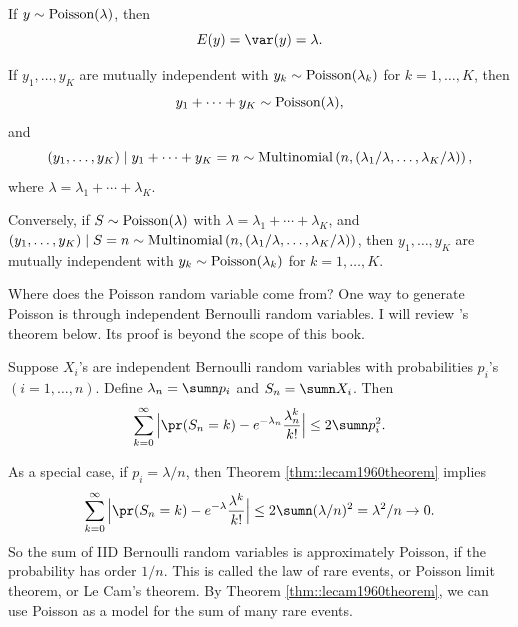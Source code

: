 \begin{proposition}\label{prop::poisson-1}
If $y\sim \textup{Poisson} (\lambda)$, then 
$$
E(y)=\var(y)=\lambda.
$$
\end{proposition}
%
% 
\begin{proposition}\label{prop::poisson-2}
If $y_1, \ldots,  y_K$ are mutually independent with $y_k\sim \textup{Poisson}(\lambda_k)$ for $k=1,\ldots, K$,
then
$$
y_{1}+\cdots + y_{K}  
\sim  \textup{Poisson}(\lambda),
$$
and
$$
(y_{1}, \ldots, y_K) \mid y_{1}+ \cdots + y_{K} = n  
\sim  \textup{Multinomial}\left(n,  (\lambda_1/ \lambda, \ldots, \lambda_K / \lambda ) \right),
$$ 
where $\lambda = \lambda_{1}+ \cdots + \lambda_{K}$. 

Conversely, if $S\sim \textup{Poisson}(\lambda)$ with $\lambda = \lambda_{1}+ \cdots + \lambda_{K}$, and $(y_{1}, \ldots, y_K) \mid S=n \sim \textup{Multinomial}\left(n,   ( \lambda_1/ \lambda, \ldots, \lambda_K / \lambda ) \right)$, then $y_1, \ldots,  y_K$ are mutually independent with $y_k\sim \textup{Poisson}(\lambda_k)$ for $k=1,\ldots, K$. 
\end{proposition}


Where does the Poisson random variable come from? One way to generate Poisson is through independent   Bernoulli random variables. I will review \citet{le1960approximation}'s theorem below. Its proof is beyond the scope of this book. 



\begin{theorem}\label{thm::lecam1960theorem}
Suppose $X_i$'s are independent Bernoulli random variables with probabilities $p_i$'s $(i=1,\ldots,n)$. Define $\lambda_n = \sumn p_i$ and $S_n = \sumn X_i$. Then
$$
\sum_{k=0}^{\infty}  \Big |   \pr(S_n = k) - e^{-\lambda_n} \frac{ \lambda_n^k }{ k!}  \Big | \leq 2\sumn p_i^2.
$$
\end{theorem}

As a special case, if $p_i = \lambda /  n$, then Theorem \ref{thm::lecam1960theorem} implies 
$$
\sum_{k=0}^{\infty}  \Big |   \pr(S_n = k) - e^{-\lambda} \frac{ \lambda^k }{ k!}  \Big | \leq 2\sumn (\lambda /  n)^2 = \lambda^2/n \rightarrow 0.
$$
So the sum of IID Bernoulli random variables is approximately Poisson,  if the probability has order $1/n.$ This is called the law of rare events, or Poisson limit theorem, or Le Cam's theorem. By Theorem \ref{thm::lecam1960theorem}, we can use Poisson as a model for the sum of many rare events. 




